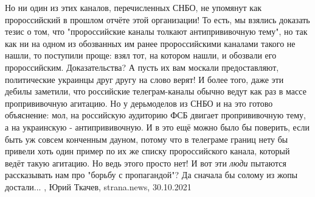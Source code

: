 Но ни один из этих каналов, перечисленных СНБО, не упомянут как пророссийский в
прошлом отчёте этой организации! То есть, мы взялись доказать тезис о том, что
"пророссийские каналы толкают антипрививочную тему", но так как ни на одном из
обозванных им ранее пророссийскими каналами такого не нашли, то поступили
проще: взял тот, на котором нашли, и обозвали его пророссийским.
Доказательства? А пусть их вам москали предоставляют, политические украинцы
друг другу на слово верят!  И более того, даже эти дебилы заметили, что
российские телеграм-каналы обычно ведут как раз в массе пропрививочную
агитацию. Но у дерьмоделов из СНБО и на это готово объяснение: мол, на
российскую аудиторию ФСБ двигает пропрививочную тему, а на украинскую -
антипрививочную. И в это ещё можно было бы поверить, если быть уж совсем
конченным дауном, потому что в телеграме границ нету бы привели хоть один
пример по их же списку пророссийского канала, который ведёт такую агитацию. Но
ведь этого просто нет!  И вот эти \emph{люди} пытаются рассказывать нам про
"борьбу с пропагандой"? Да сначала бы солому из жопы достали...
, 
Юрий Ткачев, strana.news, 30.10.2021
